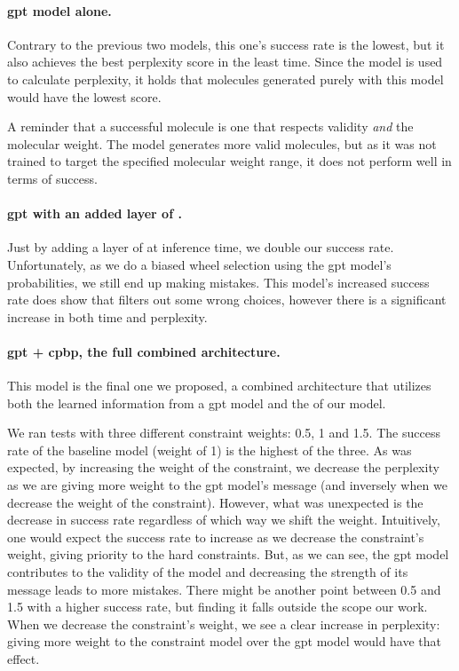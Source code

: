 \documentclass[../Document.tex]{subfiles}
\begin{document}
\paragraph{\gls{gpt} model alone.}
Contrary to the previous two models, this one's success rate is the lowest, but it also achieves the best perplexity score in the least time.
Since the model is used to calculate perplexity, it holds that molecules generated purely with this model would have the lowest score.

A reminder that a successful molecule is one that respects validity \emph{and} the molecular weight. The model generates more valid molecules, but as it was not trained to target the specified molecular weight range, it does not perform well in terms of success.

\paragraph{\gls{gpt} with an added layer of \cp.}
Just by adding a layer of \cp at inference time, we double our success rate.
Unfortunately, as we do a biased wheel selection using the \gls{gpt} model's probabilities, we still end up making mistakes.
This model's increased success rate does show that \cp filters out some wrong choices, however there is a significant increase in both time and perplexity.

\paragraph{\gls{gpt} + \gls{cpbp}, the full combined architecture.}
This model is the final one we proposed, a combined architecture that utilizes both the learned information from a \gls{gpt} model and the \bp of our \cp model.

We ran tests with three different \oracle constraint weights: 0.5, 1 and 1.5.
The success rate of the baseline model (weight of 1) is the highest of the three. 
As was expected, by increasing the weight of the constraint, we decrease the perplexity as we are giving more weight to the \gls{gpt} model's message (and inversely when we decrease the weight of the constraint).
However, what was unexpected is the decrease in success rate regardless of which way we shift the weight.
Intuitively, one would expect the success rate to increase as we decrease the \oracle constraint's weight, giving priority to the hard constraints.
But, as we can see, the \gls{gpt} model contributes to the validity of the model and decreasing the strength of its message leads to more mistakes.
There might be another point between 0.5 and 1.5 with a higher success rate, but finding it falls outside the scope our work.
When we decrease the constraint's weight, we see a clear increase in perplexity: giving more weight to the constraint model over the \gls{gpt} model would have that effect.
\end{document}
